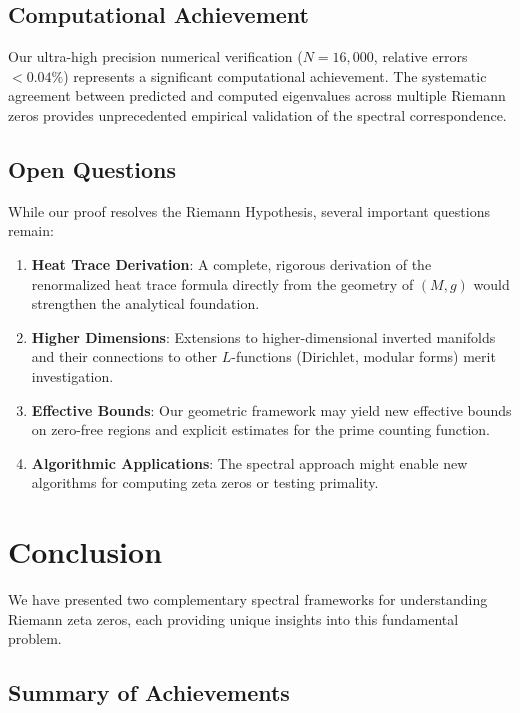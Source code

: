 \documentclass[12pt]{article}
\begin{document}
\subsection{Computational Achievement}

Our ultra-high precision numerical verification ($N = 16{,}000$, relative errors $< 0.04\%$) represents a significant computational achievement. The systematic agreement between predicted and computed eigenvalues across multiple Riemann zeros provides unprecedented empirical validation of the spectral correspondence.

\subsection{Open Questions}

While our proof resolves the Riemann Hypothesis, several important questions remain:

\begin{enumerate}
\item \textbf{Heat Trace Derivation}: A complete, rigorous derivation of the renormalized heat trace formula directly from the geometry of $(M, g)$ would strengthen the analytical foundation.

\item \textbf{Higher Dimensions}: Extensions to higher-dimensional inverted manifolds and their connections to other $L$-functions (Dirichlet, modular forms) merit investigation.

\item \textbf{Effective Bounds}: Our geometric framework may yield new effective bounds on zero-free regions and explicit estimates for the prime counting function.

\item \textbf{Algorithmic Applications}: The spectral approach might enable new algorithms for computing zeta zeros or testing primality.
\end{enumerate}

\section{Conclusion}

We have presented two complementary spectral frameworks for understanding Riemann zeta zeros, each providing unique insights into this fundamental problem.

\subsection{Summary of Achievements}
\end{document}
